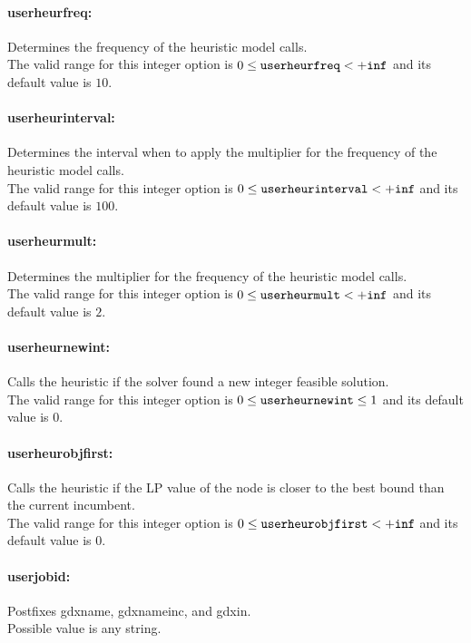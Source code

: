 \paragraph{userheurfreq:}\label{sec:userheurfreq} Determines the frequency of the heuristic model calls. $\;$ \\
 The valid range for this integer option is
$0 \le {\tt userheurfreq } <  {\tt +inf}$
and its default value is $10$.


\paragraph{userheurinterval:}\label{sec:userheurinterval} Determines the interval when to apply the multiplier for the frequency of the heuristic model calls. $\;$ \\
 The valid range for this integer option is
$0 \le {\tt userheurinterval } <  {\tt +inf}$
and its default value is $100$.


\paragraph{userheurmult:}\label{sec:userheurmult} Determines the multiplier for the frequency of the heuristic model calls. $\;$ \\
 The valid range for this integer option is
$0 \le {\tt userheurmult } <  {\tt +inf}$
and its default value is $2$.


\paragraph{userheurnewint:}\label{sec:userheurnewint} Calls the heuristic if the solver found a new integer feasible solution. $\;$ \\
 The valid range for this integer option is
$0 \le {\tt userheurnewint } \le 1$
and its default value is $0$.


\paragraph{userheurobjfirst:}\label{sec:userheurobjfirst} Calls the heuristic if the LP value of the node is closer to the best bound than the current incumbent. $\;$ \\
 The valid range for this integer option is
$0 \le {\tt userheurobjfirst } <  {\tt +inf}$
and its default value is $0$.


\paragraph{userjobid:}\label{sec:userjobid} Postfixes gdxname, gdxnameinc, and gdxin. $\;$ \\
Possible value is any string.

